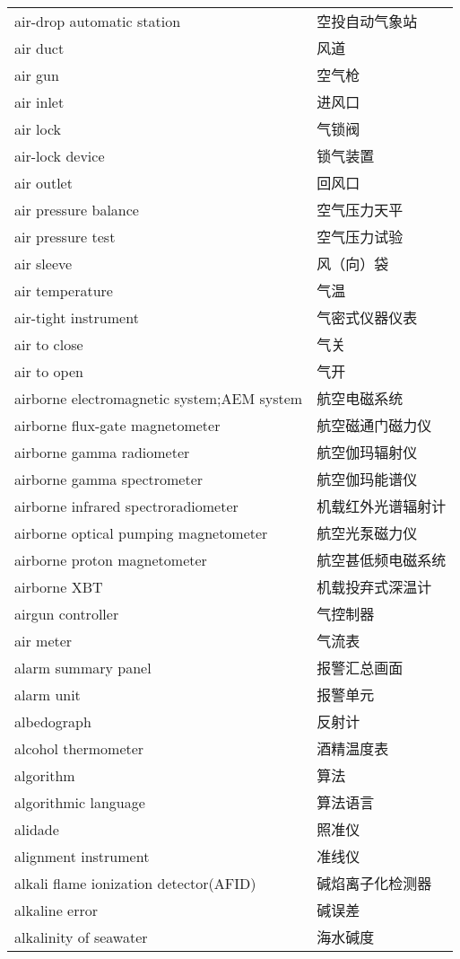 \documentclass[
]{article}
\begin{document}
\begin{longtable}[]{@{}ll@{}}
air-drop automatic station & 空投自动气象站 \\
air duct & 风道 \\
air gun & 空气枪 \\
air inlet & 进风口 \\
air lock & 气锁阀 \\
air-lock device & 锁气装置 \\
air outlet & 回风口 \\
air pressure balance & 空气压力天平 \\
air pressure test & 空气压力试验 \\
air sleeve & 风（向）袋 \\
air temperature & 气温 \\
air-tight instrument & 气密式仪器仪表 \\
air to close & 气关 \\
air to open & 气开 \\
airborne electromagnetic system;AEM system & 航空电磁系统 \\
airborne flux-gate magnetometer & 航空磁通门磁力仪 \\
airborne gamma radiometer & 航空伽玛辐射仪 \\
airborne gamma spectrometer & 航空伽玛能谱仪 \\
airborne infrared spectroradiometer & 机载红外光谱辐射计 \\
airborne optical pumping magnetometer & 航空光泵磁力仪 \\
airborne proton magnetometer & 航空甚低频电磁系统 \\
airborne XBT & 机载投弃式深温计 \\
airgun controller & 气控制器 \\
air meter & 气流表 \\
alarm summary panel & 报警汇总画面 \\
alarm unit & 报警单元 \\
albedograph & 反射计 \\
alcohol thermometer & 酒精温度表 \\
algorithm & 算法 \\
algorithmic language & 算法语言 \\
alidade & 照准仪 \\
alignment instrument & 准线仪 \\
alkali flame ionization detector(AFID) & 碱焰离子化检测器 \\
alkaline error & 碱误差 \\
alkalinity of seawater & 海水碱度 \\

\end{longtable}
\end{document}
